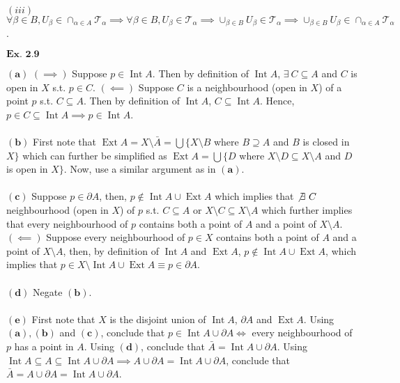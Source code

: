 \documentclass{article}
\begin{document}
$(iii)$ $\forall \beta \in B, U_{\beta}\in\cap_{\alpha\in A}\mathcal{T}_{\alpha} \implies \forall \beta \in B, U_{\beta} \in \mathcal{T}_{\alpha} \implies \cup_{\beta\in B}U_{\beta} \in \mathcal{T}_{\alpha}\implies \cup_{\beta\in B}U_{\beta}\in\cap_{\alpha\in A}\mathcal{T}_{\alpha}$.

\vspace{0.2in}

${\textbf{Ex. 2.9}}$

$\mathbf{(a)}$ $(\implies)$ Suppose $p \in \operatorname{Int}A$. Then by definition of $\operatorname{Int}A$, $\exists\ C \subseteq A$ and $C$ is open in $X$ s.t. $p \in C$. $(\impliedby)$ Suppose $C$ is a neighbourhood (open in $X$) of a point $p$ s.t. $C \subseteq A$. Then by definition of $\operatorname{Int}A$, $C \subseteq \operatorname{Int}A$. Hence, $p \in C \subseteq \operatorname{Int}A \implies p \in \operatorname{Int}A$.\\~\\

$\mathbf{(b)}$ First note that $\operatorname{Ext}A = X \setminus \bar{A} = \bigcup \{X\setminus B$ where $B \supseteq A$ and $B$ is closed in $X\}$ which can further be simplified as $\operatorname{Ext}A = \bigcup \{D$ where $X \setminus D \subseteq X \setminus A$ and $D$ is open in $X\}$. Now, use a similar argument as in $\mathbf{(a)}$.\\~\\

$\mathbf{(c)}$ Suppose $p \in \partial A$, then, $p \not\in \operatorname{Int}A \cup \operatorname{Ext}A$ which implies that $\not\exists\ C$ neighbourhood (open in $X$) of $p$ s.t. $C \subseteq A$ or $X \setminus C \subseteq X \setminus A$ which further implies that every neighbourhood of $p$ contains both a point of $A$ and a point of $X \setminus A$. $(\impliedby)$ Suppose every neighbourhood of $p \in X$ contains both a point of $A$ and a point of $X \setminus A$, then, by definition of $\operatorname{Int}A$ and $\operatorname{Ext}A$, $p \not\in \operatorname{Int}A \cup \operatorname{Ext}A$, which implies that $p \in X \setminus \operatorname{Int}A \cup \operatorname{Ext}A \equiv p \in \partial A$.\\~\\

$\mathbf{(d)}$ Negate $\mathbf{(b)}$.\\~\\

$\mathbf{(e)}$ First note that $X$ is the disjoint union of $\operatorname{Int}A$, $\partial A$ and $\operatorname{Ext}A$. Using $\mathbf{(a)}, \mathbf{(b)}$ and $\mathbf{\mathbf{(c)}}$, conclude that $p \in \operatorname{Int}A \cup \partial A \iff$ every neighbourhood of $p$ has a point in $A$. Using $\mathbf{(d)}$, conclude that $\bar{A} = \operatorname{Int}A \cup \partial A$. Using $\operatorname{Int}A \subseteq A \subseteq \operatorname{Int}A \cup \partial A \implies A \cup \partial A = \operatorname{Int}A \cup \partial A$, conclude that $\bar{A} = A \cup \partial A = \operatorname{Int}A \cup \partial A$.\\~\\
\end{document}

